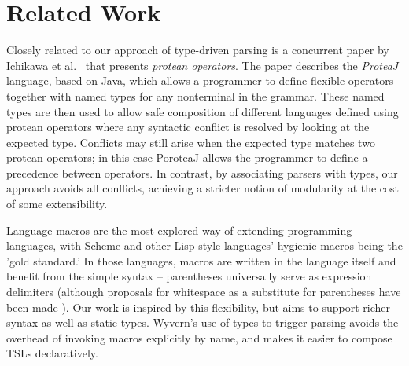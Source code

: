 \section{Related Work}
\label{s:related}

Closely related to our approach of type-driven parsing is a concurrent paper by Ichikawa et al.~\cite{Ichikawa:2014:CUO:2584469.2577092} that presents \textit{protean operators}. The paper describes the \textit{ProteaJ} language, based on Java, which allows a programmer to define flexible
operators together with named types for any nonterminal in the grammar. These named types are then used to allow safe composition of different languages defined using protean operators where any syntactic conflict is resolved by looking at the expected type. Conflicts may still arise when the expected type matches two protean operators; in this case PoroteaJ allows the programmer to define a precedence between operators.  In contrast, by associating parsers with types, our approach avoids all conflicts, achieving a stricter notion of modularity at the cost of some extensibility.




Language macros are the most explored way of extending programming languages, with Scheme and other Lisp-style languages' hygienic macros being the 'gold standard.' In those languages, macros are written in the language itself and benefit from the simple syntax -- parentheses universally serve as expression delimiters (although proposals for whitespace as a substitute for parentheses have been made \cite{srfi-49}). Our work is inspired by this flexibility, but aims to support richer syntax as well as static types. Wyvern's use of types to trigger parsing  avoids the overhead of invoking macros explicitly by name, and makes it easier to compose TSLs declaratively.

